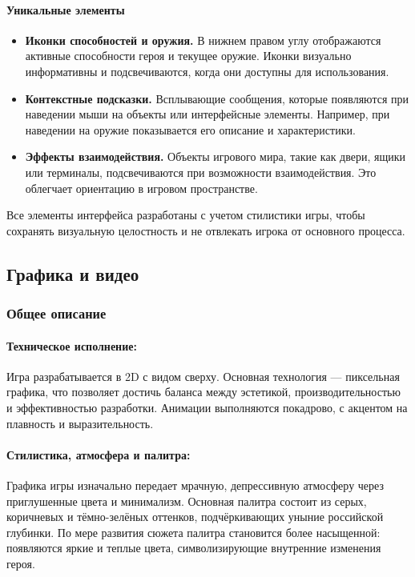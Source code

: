 \documentclass[12pt]{article}
\begin{document}
        \paragraph{Уникальные элементы}
        \begin{itemize}
            \item \textbf{Иконки способностей и оружия.} В нижнем правом углу отображаются активные способности героя и текущее оружие. Иконки визуально информативны и подсвечиваются, когда они доступны для использования.  
            \item \textbf{Контекстные подсказки.} Всплывающие сообщения, которые появляются при наведении мыши на объекты или интерфейсные элементы. Например, при наведении на оружие показывается его описание и характеристики.    
            \item \textbf{Эффекты взаимодействия.} Объекты игрового мира, такие как двери, ящики или терминалы, подсвечиваются при возможности взаимодействия. Это облегчает ориентацию в игровом пространстве.  
        \end{itemize}
        
        Все элементы интерфейса разработаны с учетом стилистики игры, чтобы сохранять визуальную целостность и не отвлекать игрока от основного процесса.

    \subsection{Графика и видео}
    \subsubsection{Общее описание}
        \paragraph{Техническое исполнение:} 
        Игра разрабатывается в 2D с видом сверху. Основная технология — пиксельная графика, что позволяет достичь баланса между эстетикой, производительностью и эффективностью разработки. Анимации выполняются покадрово, с акцентом на плавность и выразительность.
        
        \paragraph{Стилистика, атмосфера и палитра:} 
        Графика игры изначально передает мрачную, депрессивную атмосферу через приглушенные цвета и минимализм. Основная палитра состоит из серых, коричневых и тёмно-зелёных оттенков, подчёркивающих уныние российской глубинки. По мере развития сюжета палитра становится более насыщенной: появляются яркие и теплые цвета, символизирующие внутренние изменения героя.
        
\end{document}

